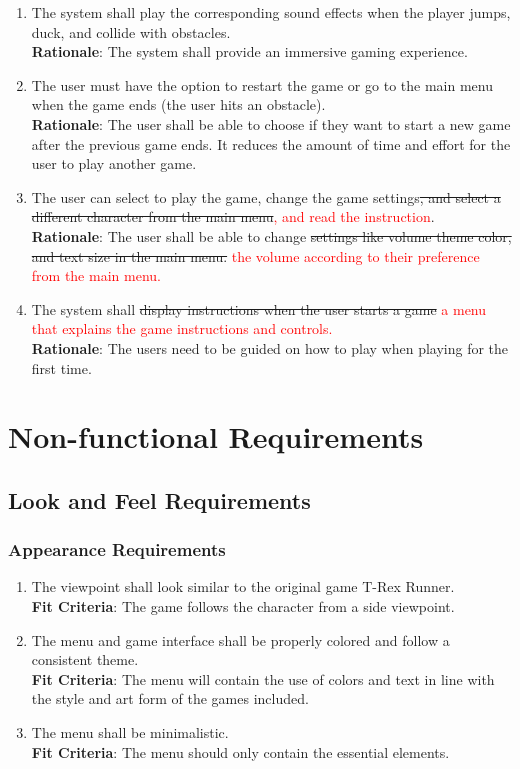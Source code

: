 \documentclass[12pt, titlepage]{article}
\begin{document}
\begin{enumerate}
	\item The system shall play the corresponding sound effects when the player jumps, duck, and collide with obstacles.\\
	\textbf{Rationale}: The system shall provide an immersive gaming experience.
	\item The user must have the option to restart the game or go to the main menu when the game ends (the user hits an obstacle).\\
	\textbf{Rationale}: The user shall be able to choose if they want to start a new game after the previous game ends. It reduces the amount of time and effort for the user to play another game.
	\item The user can select to play the game, change the game settings\sout{, and select a different character from the main menu}\textcolor{red}{, and read the instruction}.\\
	\textbf{Rationale}: The user shall be able to change \sout{settings like volume theme color, and text size in the main menu. } \textcolor{red}{the volume according to their preference from the main menu.} 
	\item The system shall \sout{display instructions when the user starts a game} \textcolor{red}{ a menu that explains the game instructions and controls.}\\
	\textbf{Rationale}: The users need to be guided on how to play when playing for the first time.
\end{enumerate}

\section{Non-functional Requirements}
\subsection{Look and Feel Requirements}
\subsubsection{Appearance Requirements}
\begin{enumerate}[leftmargin=1.20cm, label={LF \arabic*}]
    \item The viewpoint shall look similar to the original game T-Rex Runner.\\
    \textbf{Fit Criteria}: The game follows the character from a side viewpoint.
    \item The menu and game interface shall be properly colored and follow a consistent theme.\\
    \textbf{Fit Criteria}: The menu will contain the use of colors and text in line with the style and art form of the games included.
    \item The menu shall be minimalistic.\\
    \textbf{Fit Criteria}: The menu should only contain the essential elements.
\end{enumerate}
\end{document}

